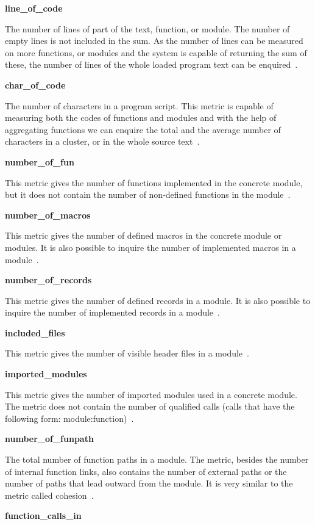 \textbf{line\_of\_code}

The number of lines of part of the text, function, or module. The number of empty lines is not included in the sum. As the number of lines can be measured on more functions, or modules and the system is capable of returning the sum of these, the number of lines of the whole loaded program text can be enquired~\cite{refactorerlm}.

\textbf{char\_of\_code}

The number of characters in a program script. This metric is capable of measuring both the codes of functions and modules and with the help of aggregating functions we can enquire the total and the average number of characters in a cluster, or in the whole source text~\cite{refactorerlm}.

\textbf{number\_of\_fun}

This metric gives the number of functions implemented in the concrete module, but it does not contain the number of non-defined functions in the module~\cite{refactorerlm}.

\textbf{number\_of\_macros}

This metric gives the number of defined macros in the concrete module or modules. It is also possible to inquire the number of implemented macros in a module~\cite{refactorerlm}.

\textbf{number\_of\_records}

 This metric gives the number of defined records in a module. It is also possible to inquire the number of implemented records in a module~\cite{refactorerlm}.

\textbf{included\_files}

This metric gives the number of visible header files in a module~\cite{refactorerlm}.

\textbf{imported\_modules}

This metric gives the number of imported modules used in a concrete module. The metric does not contain the number of qualified calls (calls that have the following form: module:function)~\cite{refactorerlm}.

\textbf{number\_of\_funpath}

The total number of function paths in a module. The metric, besides the number of internal function links, also contains the number of external paths or the number of paths that lead outward from the module. It is very similar to the metric called cohesion~\cite{refactorerlm}.

\textbf{function\_calls\_in}

